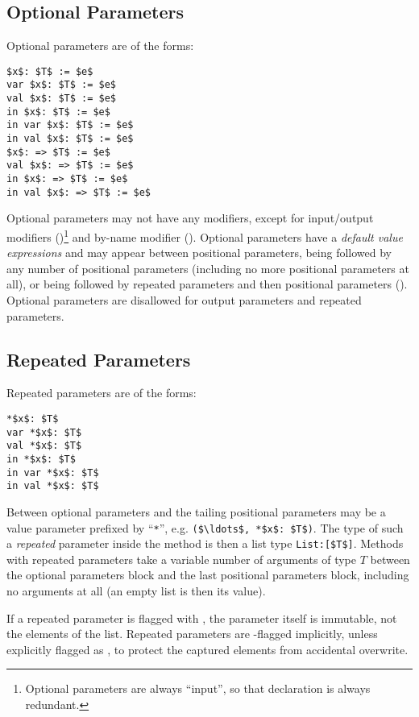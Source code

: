 \subsection{Optional Parameters}
\label{sec:optional-parameters}

Optional parameters are of the forms:
\begin{lstlisting}
$x$: $T$ := $e$
var $x$: $T$ := $e$
val $x$: $T$ := $e$
in $x$: $T$ := $e$
in var $x$: $T$ := $e$
in val $x$: $T$ := $e$
$x$: => $T$ := $e$
val $x$: => $T$ := $e$
in $x$: => $T$ := $e$
in val $x$: => $T$ := $e$
\end{lstlisting}

Optional parameters may not have any modifiers, except for input/output modifiers ()\footnote{Optional parameters are always ``input'', so that declaration is always redundant.} and by-name modifier (). Optional parameters have a {\em default value expressions} and may appear between positional parameters, being followed by any number of positional parameters (including no more positional parameters at all), or being followed by repeated parameters and then positional parameters (). Optional parameters are disallowed for output parameters and repeated parameters. 

\subsection{Repeated Parameters}
\label{sec:repeated-parameters}

Repeated parameters are of the forms:
\begin{lstlisting}
*$x$: $T$
var *$x$: $T$
val *$x$: $T$
in *$x$: $T$
in var *$x$: $T$
in val *$x$: $T$
\end{lstlisting}

Between optional parameters and the tailing positional parameters may be a value parameter prefixed by ``\lstinline!*!'', e.g. \lstinline!($\ldots$, *$x$: $T$)!. The type of such a {\em repeated} parameter inside the method is then a list type \lstinline!List:[$T$]!. Methods with repeated parameters take a variable number of arguments of type $T$ between the optional parameters block and the last positional parameters block, including no arguments at all (an empty list is then its value). 

If a repeated parameter is flagged with , the parameter itself is immutable, not the elements of the list. Repeated parameters are -flagged implicitly, unless explicitly flagged as , to protect the captured elements from accidental overwrite. 

